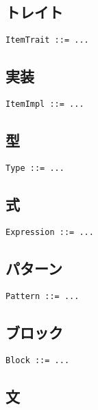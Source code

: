 \documentclass[dvipdfmx,uplatex,papersize,a4paper,10pt]{jsbook}
\theoremstyle{definition}
\begin{document}
\subsection{トレイト}

\begin{lstlisting}[language=BNFLike, gobble=2]
  ItemTrait ::= ...
\end{lstlisting}

\subsection{実装}

\begin{lstlisting}[language=BNFLike, gobble=2]
  ItemImpl ::= ...
\end{lstlisting}

\subsection{型}

\begin{lstlisting}[language=BNFLike, gobble=2]
  Type ::= ...
\end{lstlisting}

\subsection{式}

\begin{lstlisting}[language=BNFLike, gobble=2]
  Expression ::= ...
\end{lstlisting}

\subsection{パターン}

\begin{lstlisting}[language=BNFLike, gobble=2]
  Pattern ::= ...
\end{lstlisting}

\subsection{ブロック}

\begin{lstlisting}[language=BNFLike, gobble=2]
  Block ::= ...
\end{lstlisting}

\subsection{文}
\end{document}
